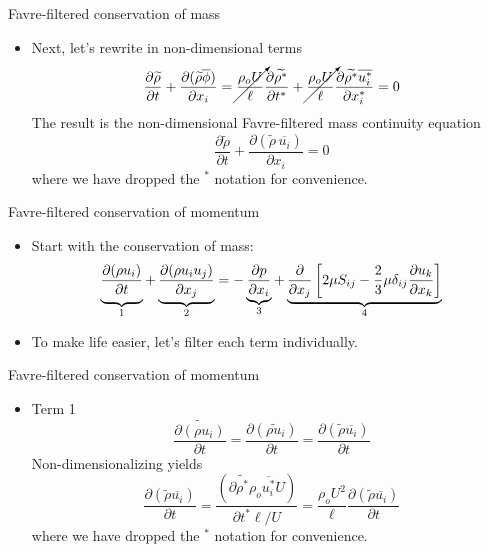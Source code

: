 
\begin{frame}{Favre-filtered conservation of mass}

\begin{itemize}
\item Next, let's rewrite in non-dimensional terms 
$$\frac{\partial \widetilde{\rho}}{\partial t} + \frac{\partial (\widetilde{\rho}\overline{\phi})}{\partial x_i} = \cancelto{}{\frac{\rho_o U}{\ell}} \frac{\partial \widetilde{\rho^*}}{\partial t^*} + \cancelto{}{\frac{\rho_o U}{\ell}}\frac{\partial\widetilde{ \rho^*}\overline{u_i^*}}{\partial x_i^*} = 0$$
The result is the non-dimensional Favre-filtered mass continuity equation
$$\boxed{\frac{\partial \widetilde{\rho}}{\partial t} + \frac{\partial (\widetilde{\rho}\,\overline{u_i})}{\partial x_i} = 0}$$
where we have dropped the $^*$ notation for convenience.
\end{itemize}
\end{frame}


\begin{frame}{Favre-filtered conservation of momentum}

\begin{itemize}
\item Start with the conservation of mass:
$$\underbrace{\vphantom{\frac{\partial (\rho u_i u_j)}{\partial x_j}}\frac{\partial (\rho u_i)}{\partial t}}_{1} + \underbrace{\frac{\partial (\rho u_i u_j)}{\partial x_j}}_{2} =  - \underbrace{\frac{\partial p}{\partial x_i}}_{3} + \underbrace{\frac{\partial}{\partial x_j}\left[ 2\mu S_{ij} - \frac{2}{3}\mu \delta_{ij} \frac{\partial u_k}{\partial x_k}\right]}_{4}$$
\item To make life easier, let's filter each term individually.
\end{itemize}
\end{frame}


\begin{frame}{Favre-filtered conservation of momentum}
\begin{itemize}
\item Term 1
$$\widetilde{\frac{\partial (\rho u_i)}{\partial t}} = \frac{\partial (\widetilde{\rho u_i})}{\partial t} = \frac{\partial (\widetilde{\rho} \overline{u_i})}{\partial t}$$
Non-dimensionalizing yields
$$\frac{\partial (\widetilde{\rho} \overline{u_i})}{\partial t} = \frac{(\partial \widetilde{\rho^*} \rho_o \overline{u_i^*} U)}{\partial t^* \ell / U} = \boxed{\frac{\rho_o U^2}{\ell} \frac{\partial (\widetilde{\rho} \overline{u_i})}{\partial t}}$$
where we have dropped the $^*$ notation for convenience.
\end{itemize}
\end{frame}

